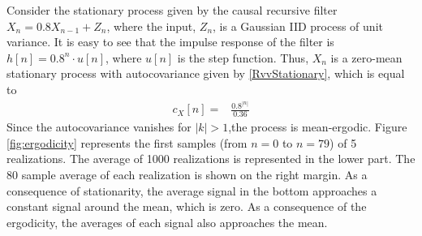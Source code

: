 
\begin{example}\label{ex:ergodic}

Consider the stationary process given by the causal recursive filter $X_n = 0.8 X_{n-1} + Z_n$, where the input, $Z_n$, is a Gaussian IID process of unit variance. It is easy to see that the impulse response of the filter is $h[n] = 0.8^n \cdot u[n]$, where $u[n]$ is the step function. Thus, $X_n$ is a zero-mean stationary process with autocovariance given by \eqref{RvvStationary}, which is equal to
\begin{align}
c_X[n] =& \frac{0.8 ^{|n|}}{0.36} 
\end{align}
Since the autocovariance vanishes for $|k|>1$,the process is mean-ergodic. Figure \ref{fig:ergodicity} represents the first samples (from $n=0$ to $n=79$) of 5 realizations. The average of 1000 realizations is represented in the lower part. The 80 sample average of each realization is shown on the right margin. As a consequence of stationarity, the average signal in the bottom approaches a constant signal around the mean, which is zero. As a consequence of the ergodicity, the averages of each signal also approaches the mean.
\end{example}


